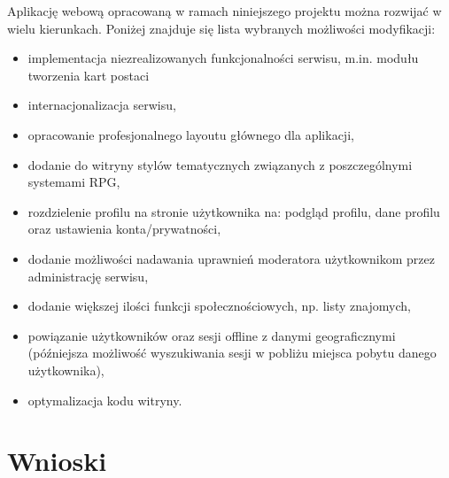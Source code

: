 Aplikację webową opracowaną w ramach niniejszego projektu można rozwijać w wielu kierunkach. Poniżej znajduje się lista wybranych możliwości modyfikacji:
\begin{itemize}
\item implementacja niezrealizowanych funkcjonalności serwisu, m.in. modułu tworzenia kart postaci
\item internacjonalizacja serwisu,
\item opracowanie profesjonalnego layoutu głównego dla aplikacji,
\item dodanie do witryny stylów tematycznych związanych z poszczególnymi systemami RPG,
\item rozdzielenie profilu na stronie użytkownika na: podgląd profilu, dane profilu oraz ustawienia konta/prywatności,
\item dodanie możliwości nadawania uprawnień moderatora użytkownikom przez administrację serwisu,
\item dodanie większej ilości funkcji społecznościowych, np. listy znajomych,
\item powiązanie użytkowników oraz sesji offline z danymi geograficznymi (późniejsza możliwość wyszukiwania sesji w pobliżu miejsca pobytu danego użytkownika),
\item optymalizacja kodu witryny.
\end{itemize}


\section{Wnioski}
\label{sec:doswiadczenia}

